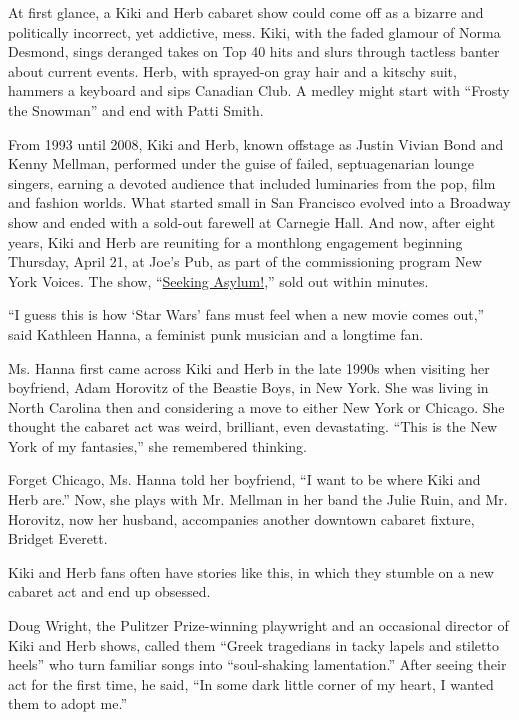 At first glance, a Kiki and Herb cabaret show could come off as a
bizarre and politically incorrect, yet addictive, mess. Kiki, with the
faded glamour of Norma Desmond, sings deranged takes on Top 40 hits and
slurs through tactless banter about current events. Herb, with
sprayed-on gray hair and a kitschy suit, hammers a keyboard and sips
Canadian Club. A medley might start with ``Frosty the Snowman'' and end
with Patti Smith.

From 1993 until 2008, Kiki and Herb, known offstage as Justin Vivian
Bond and Kenny Mellman, performed under the guise of failed,
septuagenarian lounge singers, earning a devoted audience that included
luminaries from the pop, film and fashion worlds. What started small in
San Francisco evolved into a Broadway show and ended with a sold-out
farewell at Carnegie Hall. And now, after eight years, Kiki and Herb are
reuniting for a monthlong engagement beginning Thursday, April 21, at
Joe's Pub, as part of the commissioning program New York Voices. The
show,
``\href{http://www.publictheater.org/en/tickets/calendar/playdetailscollection/joes-pub/2016/k/kiki—herb/?SiteTheme=JoesPub}{Seeking
Asylum!},'' sold out within minutes.

``I guess this is how `Star Wars' fans must feel when a new movie comes
out,'' said Kathleen Hanna, a feminist punk musician and a longtime fan.

Ms. Hanna first came across Kiki and Herb in the late 1990s when
visiting her boyfriend, Adam Horovitz of the Beastie Boys, in New York.
She was living in North Carolina then and considering a move to either
New York or Chicago. She thought the cabaret act was weird, brilliant,
even devastating. ``This is the New York of my fantasies,'' she
remembered thinking.

Forget Chicago, Ms. Hanna told her boyfriend, ``I want to be where Kiki
and Herb are.'' Now, she plays with Mr. Mellman in her band the Julie
Ruin, and Mr. Horovitz, now her husband, accompanies another downtown
cabaret fixture, Bridget Everett.

Kiki and Herb fans often have stories like this, in which they stumble
on a new cabaret act and end up obsessed.

Doug Wright, the Pulitzer Prize-winning playwright and an occasional
director of Kiki and Herb shows, called them ``Greek tragedians in tacky
lapels and stiletto heels'' who turn familiar songs into ``soul-shaking
lamentation.'' After seeing their act for the first time, he said, ``In
some dark little corner of my heart, I wanted them to adopt me.''

